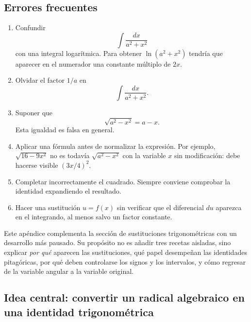 \documentclass[12pt]{article}
\theoremstyle{definition}
\theoremstyle{remark}
\begin{document}
\subsection*{Errores frecuentes}

\begin{enumerate}
\item Confundir
\[
\int\frac{dx}{a^2+x^2}
\]
con una integral logarítmica. Para obtener $\ln(a^2+x^2)$ tendría que aparecer
en el numerador una constante múltiplo de $2x$.

\item Olvidar el factor $1/a$ en
\[
\int\frac{dx}{a^2+x^2}.
\]

\item Suponer que
\[
\sqrt{a^2-x^2}=a-x.
\]
Esta igualdad es falsa en general.

\item Aplicar una fórmula antes de normalizar la expresión. Por ejemplo,
$\sqrt{16-9x^2}$ no es todavía $\sqrt{a^2-x^2}$ con la variable $x$ sin
modificación: debe hacerse visible $(3x/4)^2$.

\item Completar incorrectamente el cuadrado. Siempre conviene comprobar la
identidad expandiendo el resultado.

\item Hacer una sustitución $u=f(x)$ sin verificar que el diferencial $du$
aparezca en el integrando, al menos salvo un factor constante.
\end{enumerate}





Este apéndice complementa la sección de sustituciones trigonométricas con un desarrollo más pausado. Su propósito no es añadir tres recetas aisladas, sino explicar \emph{por qué} aparecen las sustituciones, qué papel desempeñan las identidades pitagóricas, por qué deben controlarse los signos y los intervalos, y cómo regresar de la variable angular a la variable original.

\subsection*{Idea central: convertir un radical algebraico en una identidad trigonométrica}
\end{document}
